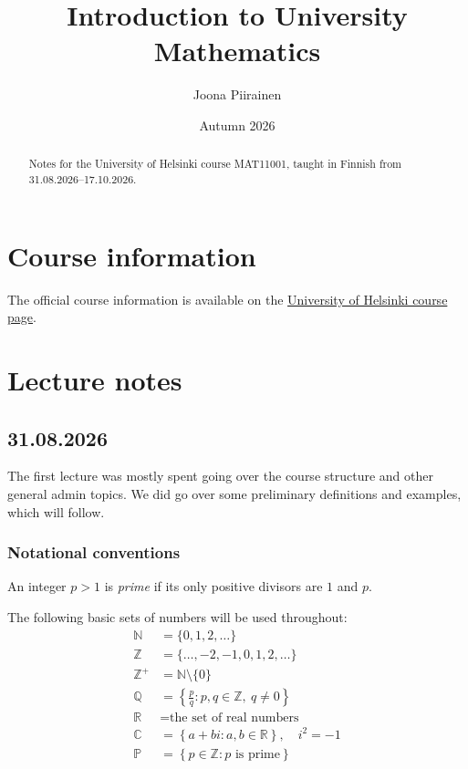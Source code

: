 \documentclass[11pt,a4paper]{amsart}
\title{Introduction to University Mathematics}
\author{Joona Piirainen}
\date{Autumn 2026}
\begin{document}
\maketitle

\begin{abstract}
  Notes for the University of Helsinki course MAT11001, taught in Finnish
  from 31.08.2026--17.10.2026.
\end{abstract}

\tableofcontents

\section{Course information}

The official course information is available on the
\href{https://studies.helsinki.fi/kurssit/toteutus/hy-opt-cur-2627-8d4269d2-7e32-4dce-bcdb-b7fa10fecac6}{University
of Helsinki course page}.

\section{Lecture notes}

\subsection{31.08.2026}

The first lecture was mostly spent going over the course structure and other
general admin topics. We did go over some preliminary definitions and examples,
which will follow.

\subsubsection{Notational conventions}

\begin{definition}
  An integer \(p > 1\) is \emph{prime} if its only positive divisors are
  \(1\) and \(p\).
\end{definition}

\begin{definition}
  The following basic sets of numbers will be used throughout:
  \begin{align*}
    \mathbb{N} &= \{0, 1, 2, \ldots\} \\
    \mathbb{Z} &= \{\ldots, -2, -1, 0, 1, 2, \ldots\} \\
    \mathbb{Z}^{+} &= \mathbb{N} \setminus \{0\} \\
    \mathbb{Q} &= \left\{\frac{p}{q} : p,q \in \mathbb{Z},\ q \neq 0\right\} \\
    \mathbb{R} &= \text{the set of real numbers} \\
    \mathbb{C} &= \left\{a+bi : a,b \in \mathbb{R}\right\}, \quad i^2=-1 \\
    \mathbb{P} &= \left\{p \in \mathbb{Z} : p \text{ is prime}\right\}
  \end{align*}
\end{definition}
\end{document}
